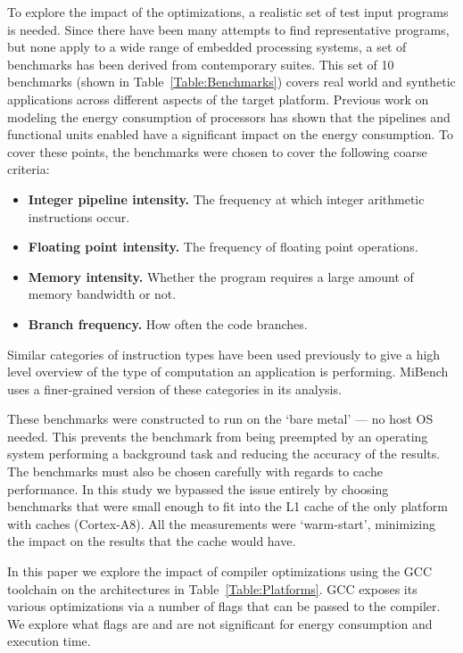 \documentclass[twocolumn]{article}
\begin{document}
To explore the impact of the optimizations, a realistic set of test input programs is needed. Since there have been many attempts to find representative programs, but none apply to a wide range of embedded processing systems, a set of benchmarks has been derived from contemporary suites. This set of 10 benchmarks (shown in Table~\ref{Table:Benchmarks}) covers real world and synthetic applications across different aspects of the target platform. Previous work on modeling the energy consumption of processors has shown that the pipelines and functional units enabled have a significant impact on the energy consumption. To cover these points, the benchmarks were chosen to cover the following coarse criteria:
\begin{itemize}
	\setlength{\itemsep}{0em}
	\vspace{-1mm}
	\item \textbf{Integer pipeline intensity.} The frequency at which integer arithmetic instructions occur.
	\item \textbf{Floating point intensity.} The frequency of floating point operations.
	\item \textbf{Memory intensity.} Whether the program requires a large amount of memory bandwidth or not.
	\item \textbf{Branch frequency.} How often the code branches.
\end{itemize}

Similar categories of instruction types have been used previously to give a high level overview of the type of computation an application is performing\cite{Hennessy2012}. MiBench\cite{MiBench} uses a finer-grained version of these categories in its analysis.

These benchmarks were constructed to run on the `bare metal' --- no host OS needed. This prevents the benchmark from being preempted by an operating system performing a background task and reducing the accuracy of the results. The benchmarks must also be chosen carefully with regards to cache performance. In this study we bypassed the issue entirely by choosing benchmarks that were small enough to fit into the L1 cache of the only platform with caches (Cortex-A8). All the measurements were `warm-start', minimizing the impact on the results that the cache would have.

In this paper we explore the impact of compiler optimizations using the GCC toolchain on the architectures in Table~\ref{Table:Platforms}. GCC exposes its various optimizations via a number of flags that can be passed to the compiler. We explore what flags are and are not significant for energy consumption and execution time.
\end{document}
